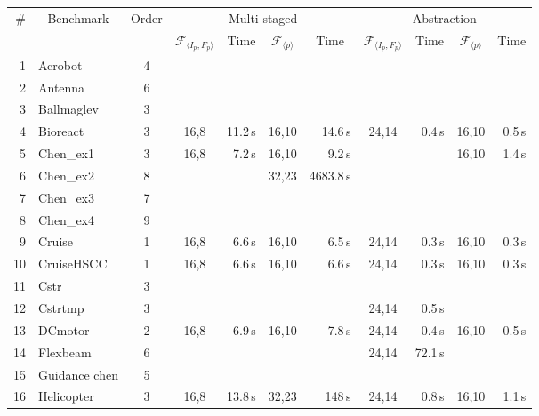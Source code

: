 \documentclass[twocolumn]{autart}    %
\newcommand{\xmark}{\ding{55}}
\begin{document}
\begin{table}
\centering
\begin{tabular}{| r | l | c | c | r | c | r | c | r | c | r |}
%
\hline
\# & \multicolumn{1}{|c|}{Benchmark} & \multicolumn{1}{|c|}{Order} & \multicolumn{4}{|c|}{Multi-staged}                 & \multicolumn{4}{|c|}{Abstraction} \\
   &                                  & & \multicolumn{1}{|c|}{$\mathcal{F}_{\langle I_p,F_p \rangle}$} & \multicolumn{1}{|c|}{Time} & \multicolumn{1}{|c|}{$\mathcal{F}_{\langle p \rangle}$} & \multicolumn{1}{|c|}{Time} & \multicolumn{1}{|c|}{$\mathcal{F}_{\langle I_p,F_p \rangle}$} & \multicolumn{1}{|c|}{Time} & \multicolumn{1}{|c|}{$\mathcal{F}_{\langle p \rangle}$} & \multicolumn{1}{|c|}{Time}\\\hline
1  & Acrobot  & 4 &  & \xmark &  & ~\xmark & & ~\xmark &  & ~\xmark \\
2  & Antenna  & 6 &  & ~\xmark &  & ~\xmark & & ~\xmark & & ~\xmark\\
3  & Ballmaglev  & 3 &  & ~\xmark &  & ~\xmark & & ~\xmark & & ~\xmark\\
4  & Bioreact & 3 & 16,8 & 11.2\,s & 16,10 &14.6\,s & 24,14 & 0.4\,s & 16,10 & 0.5\,s\\
5  & Chen\_ex1& 3 & 16,8 & 7.2\,s  & 16,10 & 9.2\,s & & ~\xmark & 16,10 & 1.4\,s\\
6  & Chen\_ex2 & 8& & ~\xmark & 32,23 & 4683.8\,s &  & ~\xmark & & ~\xmark\\
7  & Chen\_ex3 & 7 &   & ~\xmark & & ~\xmark & & ~\xmark & & ~\xmark\\
8  & Chen\_ex4 & 9 & & ~\xmark & & ~\xmark & & ~\xmark & & ~\xmark\\
9  & Cruise    & 1 & 16,8 & 6.6\,s & 16,10 & 6.5\,s & 24,14 & 0.3\,s& 16,10 & 0.3\,s\\
10 & CruiseHSCC & 1 & 16,8 & 6.6\,s & 16,10 & 6.6\,s &  24,14 & 0.3\,s & 16,10 & 0.3\,s \\
11 & Cstr & 3 & & ~\xmark & & ~\xmark & & ~\xmark & & ~\xmark\\
12 & Cstrtmp  & 3 &  & ~\xmark & & ~\xmark & 24,14 & 0.5\,s & & ~\xmark\\
13 & DCmotor   & 2 & 16,8  & 6.9\,s & 16,10 & 7.8\,s & 24,14 & 0.4\,s & 16,10 & 0.5\,s \\
14 & Flexbeam   & 6 & & ~\xmark & & ~\xmark & 24,14 & 72.1\,s & & ~\xmark\\
15 & Guidance chen  & 5 & & ~\xmark & & ~\xmark & & ~\xmark & & ~\xmark\\
16 & Helicopter   & 3 & 16,8 & 13.8\,s & 32,23 & 148\,s & 24,14 & 0.8\,s& 16,10 & 1.1\,s\\

\end{tabular}
\end{table}
\end{document}
